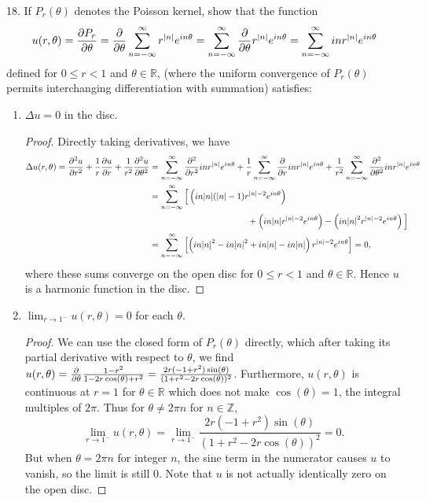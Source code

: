 \documentclass[11pt]{article}
\newcommand{\br}[1]{\left(#1\right)}
\newcommand{\sbr}[1]{\left[#1\right]}
\begin{document}
18. If $P_r(\theta)$ denotes the Poisson kernel, show that the function \[u(r,\theta) = \pdv{P_r}{\theta} = \pdv{\theta}\sum_{n=-\infty}^{\infty} r^{\abs{n}}e^{in\theta} = \sum_{n=-\infty}^{\infty} \pdv{\theta}r^{\abs{n}}e^{in\theta} = \sum_{n=-\infty}^{\infty} in r^{\abs{n}}e^{in\theta}\] defined for $0\leq r<1$ and $\theta \in \mathbb{R}$, (where the uniform convergence of $P_r(\theta)$ permits interchanging differentiation with summation) satisfies: 
\begin{enumerate}[label=(\roman*)]
    \item $\Delta u = 0$ in the disc. \begin{proof}
        Directly taking derivatives, we have \begin{align*}
            \Delta u(r,\theta) = \pdv[2]{u}{r} + \frac{1}{r}\pdv{u}{r} + \frac{1}{r^2}\pdv[2]{u}{\theta} &= \sum_{n=-\infty}^{\infty}\pdv[2]{r}in r^{\abs{n}}e^{in\theta} + \frac{1}{r}\sum_{n=-\infty}^{\infty}\pdv{r}in r^{\abs{n}}e^{in\theta} + \frac{1}{r^2}\sum_{n=-\infty}^{\infty}\pdv[2]{\theta}in r^{\abs{n}}e^{in\theta} \\
            &= \sum_{n=-\infty}^{\infty}\Big[\br{in\abs{n}(\abs{n}-1)r^{\abs{n}-2}e^{in\theta}}\\  &\hspace*{4cm} + \br{in\abs{n}r^{\abs{n}-2}e^{in\theta}} - \br{in\abs{n}^2r^{\abs{n}-2}e^{in\theta}}\Big] \\
            &= \sum_{n=-\infty}^{\infty}\sbr{\br{in\abs{n}^2-in\abs{n}^2 + in\abs{n} - in\abs{n}}r^{\abs{n}-2}e^{in\theta}} = 0,
        \end{align*} where these sums converge on the open disc for $0\leq r< 1$ and $\theta\in\mathbb{R}$. Hence $u$ is a harmonic function in the disc.
    \end{proof}
    \item $\lim_{r\to 1^{-}}u(r,\theta) = 0$ for each $\theta$. \begin{proof}
        We can use the closed form of $P_r(\theta)$ directly, which after taking its partial derivative with respect to $\theta$, we find $u(r,\theta) = \pdv{\theta} \frac{1-r^2}{1-2r\cos(\theta)+r^2} = \frac{2 r (-1 + r^2) \sin(\theta)}{(1 + r^2 - 2 r \cos(\theta))^2}$. Furthermore, $u(r,\theta)$ is continuous at $r = 1$ for $\theta\in\mathbb{R}$ which does not make $\cos(\theta) = 1$, the integral multiples of $2\pi$. Thus for $\theta \neq 2\pi n$ for $n\in\mathbb{Z}$, \[\lim_{r\to 1^{-}}u(r,\theta) = \lim_{r\to 1^{-}} \frac{2 r (-1 + r^2) \sin(\theta)}{(1 + r^2 - 2 r \cos(\theta))^2} = 0.\] But when $\theta = 2\pi n $ for integer $n$, the sine term in the numerator causes $u$ to vanish, so the limit is still $0$. Note that $u$ is not actually identically zero on the open disc.
    \end{proof}
\end{enumerate}
\end{document}
